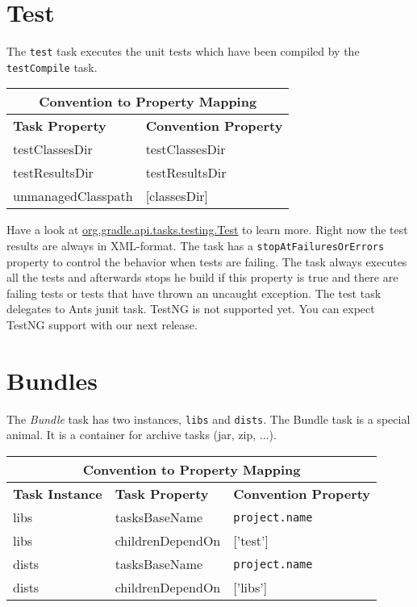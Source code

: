 \section{Test} %
\label{sec:test}
The \texttt{test} task executes the unit tests which have been compiled by the \texttt{testCompile} task. 
\begin{center}
	\begin{tabular}{|l|l|} \hline
		\multicolumn{2}{|c|}{Convention to Property Mapping} \\ \hline
	    \textbf{Task Property} & \textbf{Convention Property} \\ \hline
		testClassesDir & testClassesDir \\ \hline
		testResultsDir & testResultsDir \\ \hline
		unmanagedClasspath & [classesDir] \\ \hline
	\end{tabular} 
\end{center}
\noindent Have a look at \href{\API org/gradle/api/tasks/testing/Test.html}{org.gradle.api.tasks.testing.Test} to learn more. Right now the test results are always in XML-format. The task has a \texttt{stopAtFailuresOrErrors} property to control the behavior when tests are failing. The task always executes all the tests and afterwards stops he build if this property is true and there are failing tests or tests that have thrown an uncaught exception. The test task delegates to Ants junit task. TestNG is not supported yet. You can expect TestNG support with our next release. 

\section{Bundles} %
\label{sec:bundles}
The \emph{Bundle} task has two instances, \texttt{libs} and \texttt{dists}. The Bundle task is a special animal. It is a container for archive tasks (jar, zip, ...).  
\begin{center}
	\begin{tabular}{|l|l|l|} \hline
		\multicolumn{3}{|c|}{Convention to Property Mapping} \\ \hline
		\textbf{Task Instance} & \textbf{Task Property} & \textbf{Convention Property} \\ \hline
		libs & tasksBaseName & \texttt{project.name} \\ \hline
		libs & childrenDependOn & ['test'] \\ \hline
		dists & tasksBaseName & \texttt{project.name} \\ \hline
		dists & childrenDependOn & ['libs'] \\ \hline
	\end{tabular} 
\end{center}
